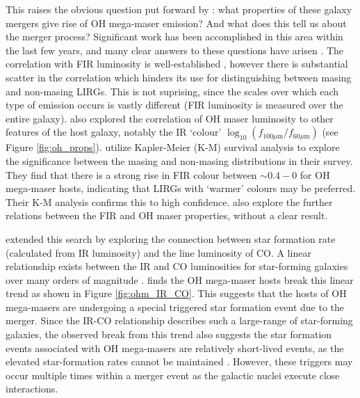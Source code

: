 This raises the obvious question put forward by \citet{lo2005}: what properties of these galaxy mergers give rise of OH mega-maser emission? And what does this tell us about the merger process? Significant work has been accomplished in this area within the last few years, and many clear answers to these questions have arisen \citep{darling2012}. The correlation with FIR luminosity is well-established \citep{darling2002_paperIII}, however there is substantial scatter in the correlation which hinders its use for distinguishing between masing and non-masing LIRGs. This is not suprising, since the scales over which each type of emission occurs is vastly different (FIR luminosity is measured over the entire galaxy). \citet{darling2002_paperIII} also explored the correlation of OH maser luminosity to other features of the host galaxy, notably the IR `colour' $\log_{10}(f_{100\mu\mathrm{m}}/f_{60\mu\mathrm{m}})$ (see Figure \ref{fig:oh_props}). \citet{darling2002_paperIII} utilize Kapler-Meier (K-M) survival analysis \citep{Feigelson_1985} to explore the significance between the masing and non-masing distributions in their survey. They find that there is a strong rise in FIR colour between $\sim0.4-0$ for OH mega-maser hosts, indicating that LIRGs with `warmer' colours may be preferred. Their K-M analysis confirms this to high confidence. \citet{darling2002_paperIII} also explore the further relations between the FIR and OH maser properties, without a clear result. 

\citet{Darling_2007} extended this search by exploring the connection between star formation rate (calculated from IR luminosity) and the line luminosity of CO. A linear relationship exists between the IR and CO luminosities for star-forming galaxies over many orders of magnitude \citep{Gao_2004}. \citet{Darling_2007} finds the OH mega-maser hosts break this linear trend as shown in Figure \ref{fig:ohm_IR_CO}. This suggests that the hosts of OH mega-masers are undergoing a special triggered star formation event due to the merger. Since the IR-CO relationship describes such a large-range of star-forming galaxies, the observed break from this trend also suggests the star formation events associated with OH mega-masers are relatively short-lived events, as the elevated star-formation rates cannot be maintained \citep{Darling_2007}. However, these triggers may occur multiple times within a merger event as the galactic nuclei execute close interactions. 

